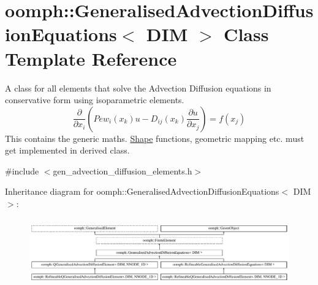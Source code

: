 \hypertarget{classoomph_1_1GeneralisedAdvectionDiffusionEquations}{}\section{oomph\+:\+:Generalised\+Advection\+Diffusion\+Equations$<$ D\+IM $>$ Class Template Reference}
\label{classoomph_1_1GeneralisedAdvectionDiffusionEquations}


A class for all elements that solve the Advection Diffusion equations in conservative form using isoparametric elements. \[ \frac{\partial}{\partial x_{i}}\left( Pe w_{i}(x_{k}) u - D_{ij}(x_{k})\frac{\partial u}{\partial x_{j}}\right) = f(x_{j}) \] This contains the generic maths. \hyperlink{classoomph_1_1Shape}{Shape} functions, geometric mapping etc. must get implemented in derived class.  




{\ttfamily \#include $<$gen\+\_\+advection\+\_\+diffusion\+\_\+elements.\+h$>$}

Inheritance diagram for oomph\+:\+:Generalised\+Advection\+Diffusion\+Equations$<$ D\+IM $>$\+:\begin{figure}[H]
\begin{center}
\leavevmode
\includegraphics[height=2.941177cm]{classoomph_1_1GeneralisedAdvectionDiffusionEquations}
\end{center}
\end{figure}
